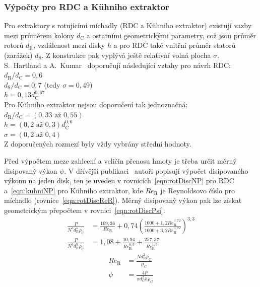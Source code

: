\subsubsection{Výpočty pro RDC a Kühniho extraktor} \label{insfunRotDisc}
Pro extraktory s rotujícími míchadly (RDC a Kühniho extraktor) existují vazby mezi průměrem kolony $d_\mathrm{C}$ a ostatními geometrickými parametry, což jsou průměr rotorů $d_\mathrm{R}$, vzdálenost mezi disky $h$ a pro RDC také vnitřní průměr statorů (zarážek) $d_\mathrm{S}$.
Z konstrukce pak vyplývá ještě relativní volná plocha $\sigma$. \\
S.~Hartland a A.~Kumar~\cite{HartlandKumar1997} doporučují následující vztahy pro návrh RDC: \\
\-\hspace{1cm} $d_\mathrm{R}/ d_\mathrm{C} = 0,6$ \\
\-\hspace{1cm} $d_\mathrm{S}/ d_\mathrm{C} = 0,7$ (tedy $\sigma = 0,49$) \\
\-\hspace{1cm} $h = 0,13 d_\mathrm{C}^{0,67}$ \\
Pro Kühniho extraktor nejsou doporučení tak jednoznačná: \\
\-\hspace{1cm} $d_\mathrm{R}/d_\mathrm{C} = (0,33\text{ až }0,55)$ \\
\-\hspace{1cm} $h = (0,2\text{ až }0,3) d_\mathrm{C}^{0,6}$ \\
\-\hspace{1cm} $\sigma = (0,2\text{ až }0,4)$ \\
Z doporučených rozmezí byly vždy vybrány střední hodnoty.

Před výpočtem meze zahlcení a veličin přenosu hmoty je třeba určit měrný disipovaný výkon $\psi$.
V dřívější publikaci~\cite{Kumar1996} autoři popisují výpočet disipovaného výkonu na jeden disk, ten je uveden v rovnicích~\ref{eqn:rotDiscNP} pro RDC a~\ref{eqn:kuhniNP} pro Kühniho extraktor, kde $Re_\mathrm{R}$ je Reynoldsovo číslo pro míchadlo (rovnice~\ref{eqn:rotDiscReR}).
Měrný disipovaný výkon pak lze získat geometrickým přepočtem v rovnici~\ref{eqn:rotDiscPsi}.
\begin{align}
\label{eqn:rotDiscNP}
	\frac{P}{ N^3 d_\mathrm{R}^5 \rho_\mathrm{C} } &=
	\frac{109,36}{ Re_\mathrm{R} } + 0,74 \left( \frac{ 1000 + 1,2 Re_\mathrm{R}^{0,72} }{ 1000 + 3,2 Re_\mathrm{R}^{0,72} } \right)^{3,3} \\
\label{eqn:kuhniNP}
	\frac{P}{ N^3 d_\mathrm{R}^5 \rho_\mathrm{C} } &=
	1,08 + \frac{10,94}{ Re_\mathrm{R}^{0,5} } + \frac{257,37}{ Re_\mathrm{R}^{1,5} }
\end{align}
\begin{align}
\label{eqn:rotDiscReR}
	Re_\mathrm{R} &= \frac{ N d_\mathrm{R}^2 \rho_\mathrm{C} }{ \mu_\mathrm{C} } \\
\label{eqn:rotDiscPsi}
	\psi &= \frac{ 4 P }{ \pi d_\mathrm{C}^2 h \rho_\mathrm{C} }
\end{align}

